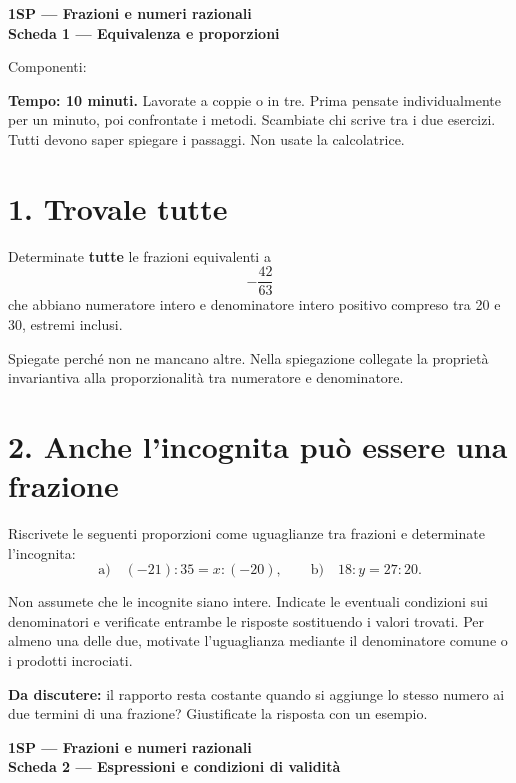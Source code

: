 \documentclass[11pt,a4paper]{article}
\begin{document}
\begin{center}
\textbf{1SP --- Frazioni e numeri razionali}\\[4pt]
\large\textbf{Scheda 1 --- Equivalenza e proporzioni}
\end{center}

Componenti: \dotfill

\textbf{Tempo: 10 minuti.} Lavorate a coppie o in tre. Prima pensate individualmente per un minuto, poi confrontate i metodi. Scambiate chi scrive tra i due esercizi. Tutti devono saper spiegare i passaggi. Non usate la calcolatrice.

\section*{1. Trovale tutte}

Determinate \textbf{tutte} le frazioni equivalenti a
\[
-\frac{42}{63}
\]
che abbiano numeratore intero e denominatore intero positivo compreso tra 20 e 30, estremi inclusi.

Spiegate perché non ne mancano altre. Nella spiegazione collegate la proprietà invariantiva alla proporzionalità tra numeratore e denominatore.

\vspace{5.5cm}

\section*{2. Anche l'incognita può essere una frazione}

Riscrivete le seguenti proporzioni come uguaglianze tra frazioni e determinate l'incognita:
\[
\text{a)}\quad (-21):35=x:(-20),
\qquad
\text{b)}\quad 18:y=27:20.
\]

Non assumete che le incognite siano intere. Indicate le eventuali condizioni sui denominatori e verificate entrambe le risposte sostituendo i valori trovati. Per almeno una delle due, motivate l'uguaglianza mediante il denominatore comune o i prodotti incrociati.

\vfill
\textbf{Da discutere:} il rapporto resta costante quando si aggiunge lo stesso numero ai due termini di una frazione? Giustificate la risposta con un esempio.

\newpage

\begin{center}
\textbf{1SP --- Frazioni e numeri razionali}\\[4pt]
\large\textbf{Scheda 2 --- Espressioni e condizioni di validità}
\end{center}
\end{document}
